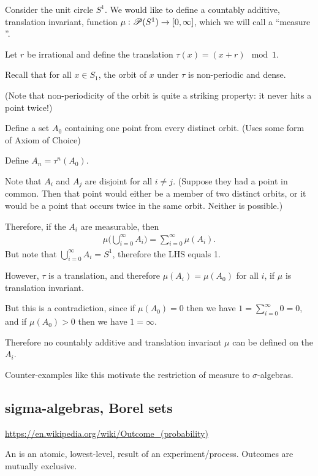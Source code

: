 \begin{example}
  Consider the unit circle $S^1$. We would like to define a countably additive, translation invariant,
  function $\mu:\mathscr{P}(S^1) \to [0, \infty]$, which we will call a ``measure​''.

  Let $r$ be irrational and define the translation $\tau(x) = (x + r) \mod 1$.

  Recall that for all $x \in S_1$, the orbit of $x$ under $\tau$ is non-periodic and dense.

  (Note that non-periodicity of the orbit is quite a striking property: it never hits a point twice!)

  Define a set $A_0$ containing one point from every distinct orbit. (Uses some form of Axiom of Choice)

  Define $A_n = \tau^n(A_0)$.

  Note that $A_i$ and $A_j$ are disjoint for all $i \neq j$. (Suppose they had a point in common. Then that
  point would either be a member of two distinct orbits, or it would be a point that occurs twice in the same
  orbit. Neither is possible.)

  Therefore, if the $A_i$ are measurable, then
  \begin{align*}
    \mu\Big(\bigcup_{i=0}^\infty A_i\Big) = \sum_{i=0}^\infty \mu(A_i).
  \end{align*}
  But note that $\bigcup_{i=0}^\infty A_i = S^1$, therefore the LHS equals 1.

  However, $\tau$ is a translation, and therefore $\mu(A_i) = \mu(A_0)$ for all $i$, if $\mu$ is translation
  invariant.

  But this is a contradiction, since if $\mu(A_0) = 0$ then we have $1 = \sum_{i=0}^\infty 0 = 0$, and
  if $\mu(A_0) > 0$ then we have $1 = \infty$.

  Therefore no countably additive and translation invariant $\mu$ can be defined on the $A_i$.

  Counter-examples like this motivate the restriction of measure to $\sigma$-algebras.
\end{example}


\subsection{sigma-algebras, Borel sets}

\url{https://en.wikipedia.org/wiki/Outcome_(probability)}


An  is an atomic, lowest-level, result of an experiment/process. Outcomes are mutually exclusive.


